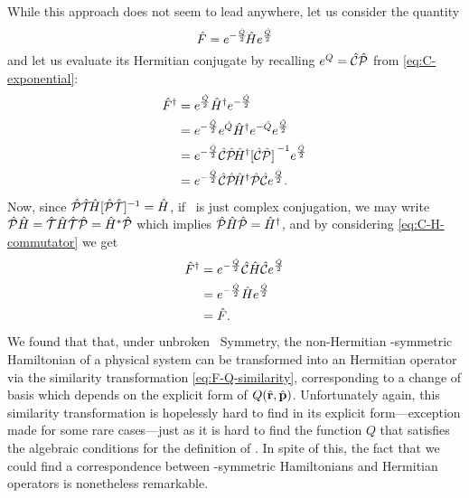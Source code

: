             While this approach does not seem to lead anywhere, let us consider the quantity
            \begin{equation}
                \label{eq:F-Q-similarity}
                \hat{F} = e^{-\frac{\hat{Q}}{2}}\!\hat{H}e^{\frac{\hat{Q}}{2}}
            \end{equation}
            and let us evaluate its Hermitian conjugate by recalling $e^{Q} = \mathcal{\hat{C}}\mathcal{\hat{P}}$ from \eqref{eq:C-exponential}:
            \begin{align*}
                \hF^\dag
                &= \myexp{\frac{\hQ}{2}} \hH^\dag \myexp{-\frac{\hQ}{2}} \\
                &= \myexp{-\frac{\hQ}{2}} \myexp{\hQ} \hH^\dag \myexp{-\hQ} \myexp{\frac{\hQ}{2}} \\
                &= \myexp{-\frac{\hQ}{2}} \hC\hP\! \hH^\dag \bqty*{\hC\hP}^{-1} \myexp{\frac{\hQ}{2}} \\
                &= \myexp{-\frac{\hQ}{2}} \hC\hP\! \hH^\dag \hP\hC \myexp{\frac{\hQ}{2}}
                \myperiod
            \end{align*}
            Now, since $\PTtransform{\hH} = \hH$, if \hT\ is just complex conjugation, we may write $\mathcal{\hat{P}}\hat{H} = \mathcal{\hat{T}}\hat{H}\mathcal{\hat{T}}\mathcal{\hat{P}} = \hat{H}^*\mathcal{\hat{P}}$ which implies $\mathcal{\hat{P}}\hat{H}\mathcal{\hat{P}} = \hat{H}^\dag$, and by considering \eqref{eq:C-H-commutator} we get \cite{bender2024}
            \begin{align*}
                \hat{F}^\dag 
                &= e^{-\frac{\hat{Q}}{2}} \mathcal{\hat{C}} \hat{H} \mathcal{\hat{C}} e^{\frac{\hat{Q}}{2}} \\
                &= e^{-\frac{\hat{Q}}{2}} \hat{H} e^{\frac{\hat{Q}}{2}} \\
                &= \hat{F}
                \text{.}
            \end{align*}
            We found that that, under unbroken \PT\ Symmetry, the non-Hermitian \PT-symmetric Hamiltonian of a physical system can be transformed into an Hermitian operator via the similarity transformation \eqref{eq:F-Q-similarity}, corresponding to a change of basis which depends on the explicit form of $Q\pqty{\hvr,\hvp}$. Unfortunately again, this similarity transformation is hopelessly hard to find in its explicit form---exception made for some rare cases---just as it is hard to find the function $Q$ that satisfies the algebraic conditions for the definition of \hC \cite{bender2024}. In spite of this, the fact that we could find a correspondence between \PT-symmetric Hamiltonians and Hermitian operators is nonetheless remarkable.
            
